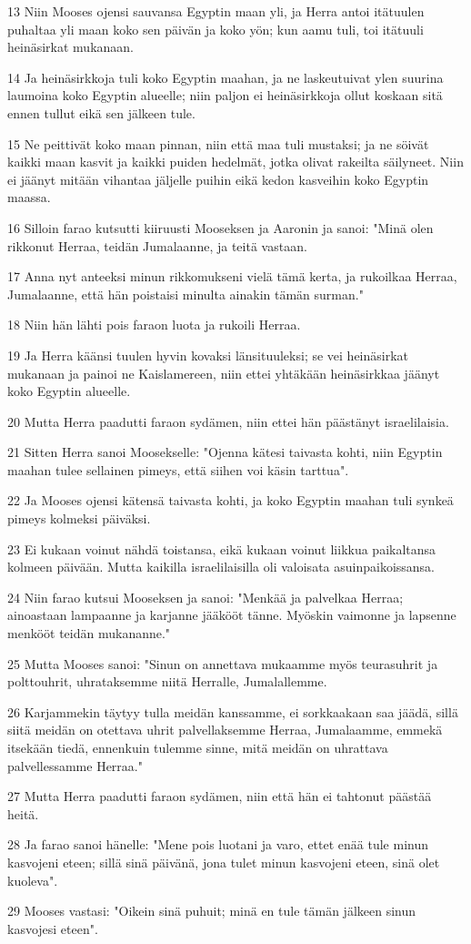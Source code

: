 \par 13 Niin Mooses ojensi sauvansa Egyptin maan yli, ja Herra antoi itätuulen puhaltaa yli maan koko sen päivän ja koko yön; kun aamu tuli, toi itätuuli heinäsirkat mukanaan.
\par 14 Ja heinäsirkkoja tuli koko Egyptin maahan, ja ne laskeutuivat ylen suurina laumoina koko Egyptin alueelle; niin paljon ei heinäsirkkoja ollut koskaan sitä ennen tullut eikä sen jälkeen tule.
\par 15 Ne peittivät koko maan pinnan, niin että maa tuli mustaksi; ja ne söivät kaikki maan kasvit ja kaikki puiden hedelmät, jotka olivat rakeilta säilyneet. Niin ei jäänyt mitään vihantaa jäljelle puihin eikä kedon kasveihin koko Egyptin maassa.
\par 16 Silloin farao kutsutti kiiruusti Mooseksen ja Aaronin ja sanoi: "Minä olen rikkonut Herraa, teidän Jumalaanne, ja teitä vastaan.
\par 17 Anna nyt anteeksi minun rikkomukseni vielä tämä kerta, ja rukoilkaa Herraa, Jumalaanne, että hän poistaisi minulta ainakin tämän surman."
\par 18 Niin hän lähti pois faraon luota ja rukoili Herraa.
\par 19 Ja Herra käänsi tuulen hyvin kovaksi länsituuleksi; se vei heinäsirkat mukanaan ja painoi ne Kaislamereen, niin ettei yhtäkään heinäsirkkaa jäänyt koko Egyptin alueelle.
\par 20 Mutta Herra paadutti faraon sydämen, niin ettei hän päästänyt israelilaisia.
\par 21 Sitten Herra sanoi Moosekselle: "Ojenna kätesi taivasta kohti, niin Egyptin maahan tulee sellainen pimeys, että siihen voi käsin tarttua".
\par 22 Ja Mooses ojensi kätensä taivasta kohti, ja koko Egyptin maahan tuli synkeä pimeys kolmeksi päiväksi.
\par 23 Ei kukaan voinut nähdä toistansa, eikä kukaan voinut liikkua paikaltansa kolmeen päivään. Mutta kaikilla israelilaisilla oli valoisata asuinpaikoissansa.
\par 24 Niin farao kutsui Mooseksen ja sanoi: "Menkää ja palvelkaa Herraa; ainoastaan lampaanne ja karjanne jääkööt tänne. Myöskin vaimonne ja lapsenne menkööt teidän mukananne."
\par 25 Mutta Mooses sanoi: "Sinun on annettava mukaamme myös teurasuhrit ja polttouhrit, uhrataksemme niitä Herralle, Jumalallemme.
\par 26 Karjammekin täytyy tulla meidän kanssamme, ei sorkkaakaan saa jäädä, sillä siitä meidän on otettava uhrit palvellaksemme Herraa, Jumalaamme, emmekä itsekään tiedä, ennenkuin tulemme sinne, mitä meidän on uhrattava palvellessamme Herraa."
\par 27 Mutta Herra paadutti faraon sydämen, niin että hän ei tahtonut päästää heitä.
\par 28 Ja farao sanoi hänelle: "Mene pois luotani ja varo, ettet enää tule minun kasvojeni eteen; sillä sinä päivänä, jona tulet minun kasvojeni eteen, sinä olet kuoleva".
\par 29 Mooses vastasi: "Oikein sinä puhuit; minä en tule tämän jälkeen sinun kasvojesi eteen".

